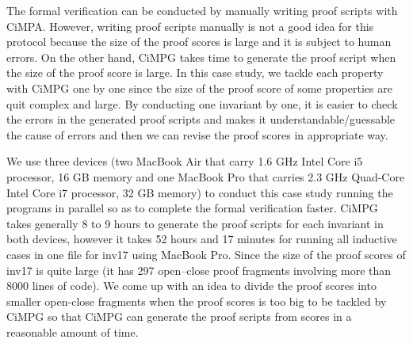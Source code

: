 \documentclass[a4paper,fleqn]{cas-dc}
\begin{document}
The formal verification can be conducted by manually writing proof  scripts with CiMPA. However, writing proof scripts manually is not a good idea for this protocol because the size of the proof scores is large and it is subject to human errors. On the other hand, CiMPG takes time to generate the proof script when the size of the proof score is large. In this case study, we tackle each property with CiMPG one by one since the size of the proof score of some properties are quit complex and large. By conducting one invariant by one, it is easier to check the errors in the generated proof scripts and makes it understandable/guessable the cause of errors and then we can revise the proof scores in appropriate way. 

We use three devices (two MacBook Air that carry 1.6 GHz Intel Core i5 processor, 16 GB memory and one MacBook Pro that carries 2.3 GHz Quad-Core Intel Core i7 processor, 32 GB memory) to conduct this case study running the programs in parallel so as to complete the formal verification faster. CiMPG takes generally 8 to 9 hours to generate the proof scripts for each invariant in both devices, however it takes 52 hours and 17 minutes for running all inductive cases in one file for inv17 using MacBook Pro. Since the size of the proof scores of inv17 is quite large (it has 297 open–close proof fragments involving more than 8000 lines of code). We come up with an idea to divide the proof scores into smaller  open-close fragments when the proof scores is too big to be tackled by CiMPG so that CiMPG can generate the proof scripts from scores in a reasonable amount of time.
\end{document}
